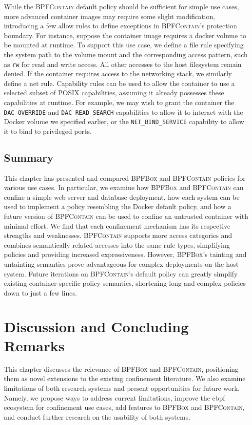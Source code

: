 \documentclass[
  fontsize=12pt,
  titlepage=firstiscover,
  paper=letter,
oneside,
  cleardoublepage=plain,
  parskip=half-,
  DIV=10,
  parindent,
  appendixprefix,
  chapterprefix,
  listof=totoc,
]{scrbook}
\newcommand{\bpfbox}{\textsc{BPFBox}}
\newcommand{\bpfcontain}{\textsc{BPFContain}}
\begin{document}
While the \bpfcontain{} default policy should be sufficient for simple use cases, more
advanced container images may require some slight modification, introducing a few allow
rules to define exceptions in \bpfcontain{}'s protection boundary. For instance, suppose
the container image requires a docker volume to be mounted at runtime. To support this use
case, we define a file rule specifying the system path to the volume mount and the
corresponding access pattern, such as \texttt{rw} for read and write access. All other
accesses to the host filesystem remain denied. If the container requires access to the
networking stack, we similarly define a net rule.  Capability rules can be used to allow
the container to use a selected subset of POSIX capabilities, assuming it already
possesses these capabilities at runtime. For example, we may wish to grant the container
the \texttt{DAC\_OVERRIDE} and \texttt{DAC\_READ\_SEARCH} capabilities to allow it to
interact with the Docker volume we specified earlier, or the \texttt{NET\_BIND\_SERVICE}
capability to allow it to bind to privileged ports.




\section{Summary}

This chapter has presented and compared \bpfbox{} and \bpfcontain{} policies for various
use cases. In particular, we examine how \bpfbox{} and \bpfcontain{} can confine a simple
web server and database deployment,  how each system can be used to implement a policy
resembling the Docker default policy, and how a future version of \bpfcontain{} can be
used to confine an untrusted container with minimal effort. We find that each confinement
mechanism has its respective strengths and weaknesses.  \bpfcontain{} supports more access
categories and combines semantically related accesses into the same rule types,
simplifying policies and providing increased expressiveness. However, \bpfbox{}'s tainting
and untainting semantics prove advantageous for complex deployments on the host system.
Future iterations on \bpfcontain{}'s default policy can greatly simplify existing
container-specific policy semantics, shortening long and complex policies down to just
a few lines.
 
\chapter{Discussion and Concluding Remarks}\label{c:discussion}
This chapter discusses the relevance of \bpfbox{} and \bpfcontain{}, positioning them as
novel extensions to the existing confinement literature. We also examine
limitations of both research systems and present opportunities for future work. Namely, we
propose ways to address current limitations, improve the \gls{ebpf} ecosystem for
confinement use cases, add features to \bpfbox{} and \bpfcontain{}, and conduct further
research on the usability of both systems.
\end{document}
